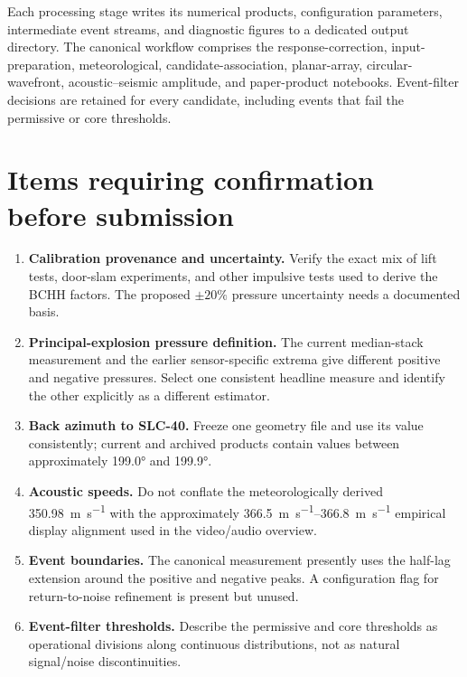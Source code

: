 \documentclass[12pt]{article}
\begin{document}
Each processing stage writes its numerical products, configuration parameters,
intermediate event streams, and diagnostic figures to a dedicated output
directory. The canonical workflow comprises the response-correction,
input-preparation, meteorological, candidate-association, planar-array,
circular-wavefront, acoustic--seismic amplitude, and paper-product notebooks.
Event-filter decisions are retained for every candidate, including events that
fail the permissive or core thresholds.

\clearpage
\section*{Items requiring confirmation before submission}

\begin{enumerate}[leftmargin=*]
  \item \textbf{Calibration provenance and uncertainty.} Verify the exact mix
  of lift tests, door-slam experiments, and other impulsive tests used to derive
  the BCHH factors. The proposed $\pm20\%$ pressure uncertainty needs a documented
  basis.

  \item \textbf{Principal-explosion pressure definition.} The current
  median-stack measurement and the earlier sensor-specific extrema give
  different positive and negative pressures. Select one consistent headline
  measure and identify the other explicitly as a different estimator.

  \item \textbf{Back azimuth to SLC-40.} Freeze one geometry file and use its
  value consistently; current and archived products contain values between
  approximately \ang{199.0} and \ang{199.9}.

  \item \textbf{Acoustic speeds.} Do not conflate the meteorologically derived
  \SI{350.98}{\metre\per\second} with the approximately
  \SIrange{366.5}{366.8}{\metre\per\second} empirical display alignment used in
  the video/audio overview.

  \item \textbf{Event boundaries.} The canonical measurement presently uses
  the half-lag extension around the positive and negative peaks. A configuration
  flag for return-to-noise refinement is present but unused.

  \item \textbf{Event-filter thresholds.} Describe the permissive and core
  thresholds as operational divisions along continuous distributions, not as
  natural signal/noise discontinuities.


\end{enumerate}
\end{document}
